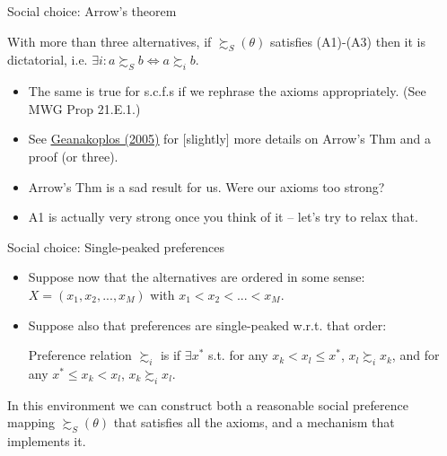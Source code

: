 \documentclass[english,10pt
,aspectratio=169
]{beamer}
\begin{document}
\begin{frame}{Social choice: Arrow's theorem}
	\begin{theorem}[Arrow, 1950]
		With more than three alternatives, if $\succsim_S(\theta)$ satisfies (A1)-(A3) then it is dictatorial, i.e. $\exists i: a \succsim_S b \Leftrightarrow a \succsim_i b$.
	\end{theorem}
	\begin{itemize}
		\item The same is true for s.c.f.s if we rephrase the axioms appropriately. (See MWG Prop 21.E.1.)
		\item See \href{https://link.springer.com/article/10.1007/s00199-004-0556-7}{\uline{Geanakoplos (2005)}} for [slightly] more details on Arrow's Thm and a proof (or three).
		\item Arrow's Thm is a sad result for us. Were our axioms too strong?
		\item A1 is actually very strong once you think of it -- let's try to relax that.
	\end{itemize}
\end{frame}


\begin{frame}{Social choice: Single-peaked preferences}
	\begin{itemize}
		\item Suppose now that the alternatives are ordered in some sense: \\
		$X = (x_1, x_2, ..., x_M)$ with $x_1 < x_2 < ... < x_M$.
		\item Suppose also that preferences are single-peaked w.r.t. that order:
		\begin{exampleblock}{}
			Preference relation $\succsim_i$ is  if $\exists x^*$ s.t. for any $x_k < x_l\leq x^*$, $x_l \succsim_i x_k$, and for any $x^* \leq x_k < x_l$, $x_k \succsim_i x_l$.
		\end{exampleblock}
	\end{itemize}
	In this environment  we can construct both a reasonable social preference mapping $\succsim_S(\theta)$ that satisfies all the axioms, and a mechanism that implements it.
\end{frame}
\end{document}
